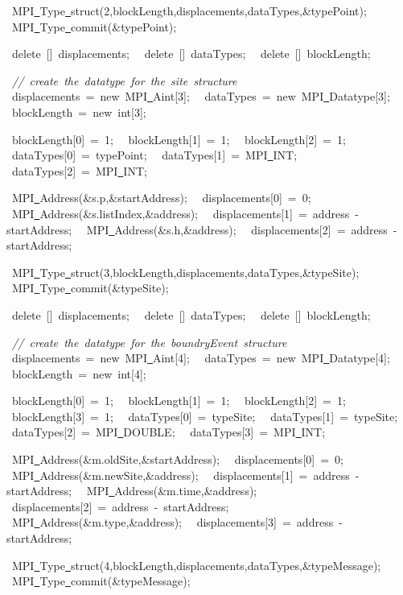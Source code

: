 {\ \ MPI\underline\ Type\underline\ struct(2,blockLength,displacements,dataTypes,\&typePoint);
\ \ MPI\underline\ Type\underline\ commit(\&typePoint);

\ \ delete\ []\ displacements;
\ \ delete\ []\ dataTypes;
\ \ delete\ []\ blockLength;

\ \ \textsl{//\ create\ the\ datatype\ for\ the\ site\ structure}
\ \ displacements\ =\ new\ MPI\underline\ Aint[3];
\ \ dataTypes\ =\ new\ MPI\underline\ Datatype[3];
\ \ blockLength\ =\ new\ int[3];

\ \ blockLength[0]\ =\ 1;
\ \ blockLength[1]\ =\ 1;
\ \ blockLength[2]\ =\ 1;
\ \ dataTypes[0]\ =\ typePoint;
\ \ dataTypes[1]\ =\ MPI\underline\ INT;
\ \ dataTypes[2]\ =\ MPI\underline\ INT;

\ \ MPI\underline\ Address(\&s.p,\&startAddress);
\ \ displacements[0]\ =\ 0;
\ \ MPI\underline\ Address(\&s.listIndex,\&address);
\ \ displacements[1]\ =\ address\ -{}\ startAddress;
\ \ MPI\underline\ Address(\&s.h,\&address);
\ \ displacements[2]\ =\ address\ -{}\ startAddress;

\ \ MPI\underline\ Type\underline\ struct(3,blockLength,displacements,dataTypes,\&typeSite);
\ \ MPI\underline\ Type\underline\ commit(\&typeSite);

\ \ delete\ []\ displacements;
\ \ delete\ []\ dataTypes;
\ \ delete\ []\ blockLength;

\ \ \textsl{//\ create\ the\ datatype\ for\ the\ boundryEvent\ structure}
\ \ displacements\ =\ new\ MPI\underline\ Aint[4];
\ \ dataTypes\ =\ new\ MPI\underline\ Datatype[4];
\ \ blockLength\ =\ new\ int[4];

\ \ blockLength[0]\ =\ 1;
\ \ blockLength[1]\ =\ 1;
\ \ blockLength[2]\ =\ 1;
\ \ blockLength[3]\ =\ 1;
\ \ dataTypes[0]\ =\ typeSite;
\ \ dataTypes[1]\ =\ typeSite;
\ \ dataTypes[2]\ =\ MPI\underline\ DOUBLE;
\ \ dataTypes[3]\ =\ MPI\underline\ INT;

\ \ MPI\underline\ Address(\&m.oldSite,\&startAddress);
\ \ displacements[0]\ =\ 0;
\ \ MPI\underline\ Address(\&m.newSite,\&address);
\ \ displacements[1]\ =\ address\ -{}\ startAddress;
\ \ MPI\underline\ Address(\&m.time,\&address);
\ \ displacements[2]\ =\ address\ -{}\ startAddress;
\ \ MPI\underline\ Address(\&m.type,\&address);
\ \ displacements[3]\ =\ address\ -{}\ startAddress;

\ \ MPI\underline\ Type\underline\ struct(4,blockLength,displacements,dataTypes,\&typeMessage);
\ \ MPI\underline\ Type\underline\ commit(\&typeMessage);

}
